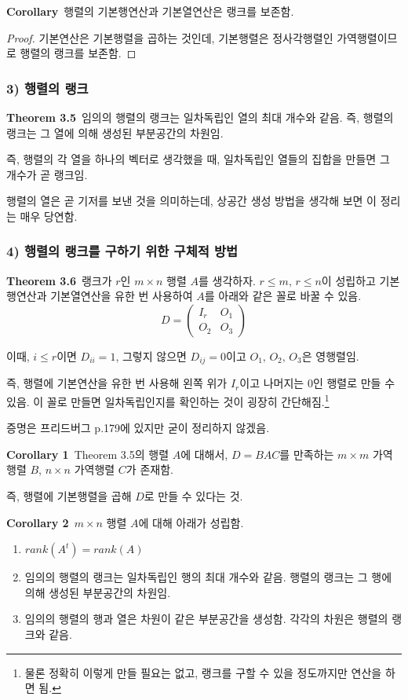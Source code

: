 \textbf{Corollary}\, 행렬의 기본행연산과 기본열연산은 랭크를 보존함.

\begin{proof}
기본연산은 기본행렬을 곱하는 것인데, 기본행렬은 정사각행렬인 가역행렬이므로 행렬의 랭크를 보존함.
\end{proof}

\subsubsection*{3) 행렬의 랭크}
\textbf{Theorem 3.5}\, 임의의 행렬의 랭크는 일차독립인 열의 최대 개수와 같음. 즉, 행렬의 랭크는 그 열에 의해 생성된 부분공간의 차원임.

즉, 행렬의 각 열을 하나의 벡터로 생각했을 때, 일차독립인 열들의 집합을 만들면 그 개수가 곧 랭크임.

행렬의 열은 곧 기저를 보낸 것을 의미하는데, 상공간 생성 방법을 생각해 보면 이 정리는 매우 당연함.


\subsubsection*{4) 행렬의 랭크를 구하기 위한 구체적 방법}
\textbf{Theorem 3.6}\, 랭크가 $r$인 $m \times n$ 행렬 $A$를 생각하자. $r \leq m,\,r \leq n$이 성립하고 기본행연산과 기본열연산을 유한 번 사용하여 $A$를 아래와 같은 꼴로 바꿀 수 있음.
\[
D=
\begin{pmatrix}
I_r & O_1\\
O_2 & O_3
\end{pmatrix}
\]

이때, $i \leq r$이면 $D_{ii}=1$, 그렇지 않으면 $D_{ij}=0$이고 $O_1,\,O_2,\,O_3$은 영행렬임.

즉, 행렬에 기본연산을 유한 번 사용해 왼쪽 위가 $I_r$이고 나머지는 0인 행렬로 만들 수 있음. 이 꼴로 만들면 일차독립인지를 확인하는 것이 굉장히 간단해짐.\footnote{물론 정확히 이렇게 만들 필요는 없고, 랭크를 구할 수 있을 정도까지만 연산을 하면 됨.}

증명은 프리드버그 p.179에 있지만 굳이 정리하지 않겠음.


\newpage


\textbf{Corollary 1}\, Theorem 3.5의 행렬 $A$에 대해서, $D=BAC$를 만족하는 $m \times m$ 가역행렬 $B$, $n \times n$ 가역행렬 $C$가 존재함.

즉, 행렬에 기본행렬을 곱해 $D$로 만들 수 있다는 것.

\textbf{Corollary 2}\, $m \times n$ 행렬 $A$에 대해 아래가 성립함.
\begin{enumerate}
    \item $rank(A^t)=rank(A)$
    \item 임의의 행렬의 랭크는 일차독립인 행의 최대 개수와 같음. 행렬의 랭크는 그 행에 의해 생성된 부분공간의 차원임.
    \item 임의의 행렬의 행과 열은 차원이 같은 부분공간을 생성함. 각각의 차원은 행렬의 랭크와 같음.
\end{enumerate}

